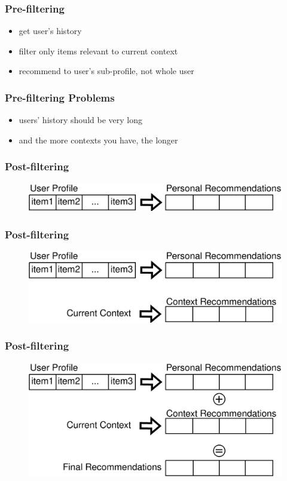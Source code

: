 \documentclass[t]{beamer}
\begin{document}
\begin{frame}
  \frametitle{Pre-filtering}
  \begin{itemize}
  \item get user's history
  \item filter only items relevant to current context
  \item recommend to user's sub-profile, not whole user
  \end{itemize}
\end{frame}
\begin{frame}
  \frametitle{Pre-filtering Problems}
  \begin{itemize}
  \item users' history should be very long
  \item and the more contexts you have, the longer
  \end{itemize}
\end{frame}
\begin{frame}
  \frametitle{Post-filtering}
\begin{figure}
\includegraphics[scale=0.2]{post-filtering1}
\end{figure}
\end{frame}
\begin{frame}
  \frametitle{Post-filtering}
\begin{figure}
\includegraphics[scale=0.2]{post-filtering2}
\end{figure}
\end{frame}
\begin{frame}
  \frametitle{Post-filtering}
\begin{figure}
\includegraphics[scale=0.2]{post-filtering3}
\end{figure}
\end{frame}
\end{document}
